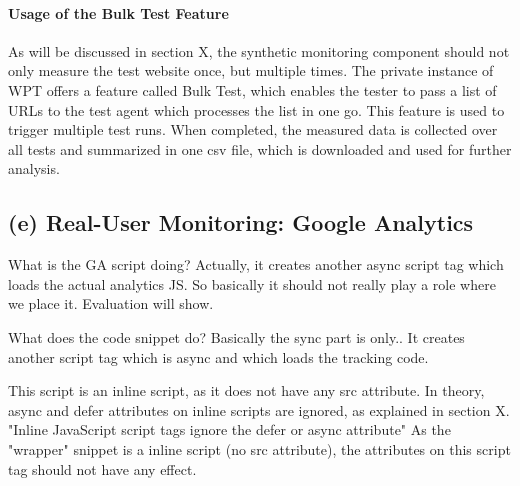 
\paragraph{Usage of the Bulk Test Feature}

As will be discussed in section X, the synthetic monitoring component should not only measure the test website once, but multiple times.
The private instance of WPT offers a feature called Bulk Test, which enables the tester to pass a list of URLs to the test agent which processes the list in one go.
This feature is used to trigger multiple test runs.
When completed, the measured data is collected over all tests and summarized in one csv file, which is downloaded and used for further analysis.





\subsection{(e) Real-User Monitoring: Google Analytics}







What is the GA script doing?
Actually, it creates another async script tag which loads the actual analytics JS.
So basically it should not really play a role where we place it.
Evaluation will show.

What does the code snippet do?
Basically the sync part is only..
It creates another script tag which is async and which loads the tracking code.

This script is an inline script, as it does not have any src attribute.
In theory,  async and defer attributes on inline scripts are ignored, as explained in section X.
"Inline JavaScript script tags ignore the defer or async attribute"
As the "wrapper" snippet is a inline script (no src attribute), the attributes on this script tag should not have any effect.



